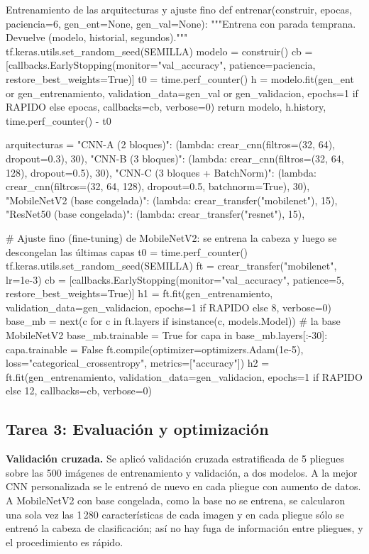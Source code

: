 \documentclass[11pt,letterpaper]{article}
\begin{document}
\begin{codigo}[label=cod:entrenar]{Entrenamiento de las arquitecturas y ajuste fino}
def entrenar(construir, epocas, paciencia=6, gen_ent=None, gen_val=None):
    """Entrena con parada temprana. Devuelve (modelo, historial, segundos)."""
    tf.keras.utils.set_random_seed(SEMILLA)
    modelo = construir()
    cb = [callbacks.EarlyStopping(monitor="val_accuracy", patience=paciencia, restore_best_weights=True)]
    t0 = time.perf_counter()
    h = modelo.fit(gen_ent or gen_entrenamiento, validation_data=gen_val or gen_validacion,
                   epochs=1 if RAPIDO else epocas, callbacks=cb, verbose=0)
    return modelo, h.history, time.perf_counter() - t0

arquitecturas = {
    "CNN-A (2 bloques)": (lambda: crear_cnn(filtros=(32, 64), dropout=0.3), 30),
    "CNN-B (3 bloques)": (lambda: crear_cnn(filtros=(32, 64, 128), dropout=0.5), 30),
    "CNN-C (3 bloques + BatchNorm)": (lambda: crear_cnn(filtros=(32, 64, 128), dropout=0.5, batchnorm=True), 30),
    "MobileNetV2 (base congelada)": (lambda: crear_transfer("mobilenet"), 15),
    "ResNet50 (base congelada)": (lambda: crear_transfer("resnet"), 15),
}

# Ajuste fino (fine-tuning) de MobileNetV2: se entrena la cabeza y luego se descongelan las últimas capas
t0 = time.perf_counter()
tf.keras.utils.set_random_seed(SEMILLA)
ft = crear_transfer("mobilenet", lr=1e-3)
cb = [callbacks.EarlyStopping(monitor="val_accuracy", patience=5, restore_best_weights=True)]
h1 = ft.fit(gen_entrenamiento, validation_data=gen_validacion, epochs=1 if RAPIDO else 8, verbose=0)
base_mb = next(c for c in ft.layers if isinstance(c, models.Model))   # la base MobileNetV2
base_mb.trainable = True
for capa in base_mb.layers[:-30]:
    capa.trainable = False
ft.compile(optimizer=optimizers.Adam(1e-5), loss="categorical_crossentropy", metrics=["accuracy"])
h2 = ft.fit(gen_entrenamiento, validation_data=gen_validacion, epochs=1 if RAPIDO else 12, callbacks=cb, verbose=0)
\end{codigo}

\subsection{Tarea 3: Evaluación y optimización}

\textbf{Validación cruzada.} Se aplicó validación cruzada estratificada de 5 pliegues sobre las 500 imágenes de entrenamiento y validación, a dos modelos. A la mejor CNN personalizada se le entrenó de nuevo en cada pliegue con aumento de datos. A MobileNetV2 con base congelada, como la base no se entrena, se calcularon una sola vez las 1\,280 características de cada imagen y en cada pliegue sólo se entrenó la cabeza de clasificación; así no hay fuga de información entre pliegues, y el procedimiento es rápido.
\end{document}
